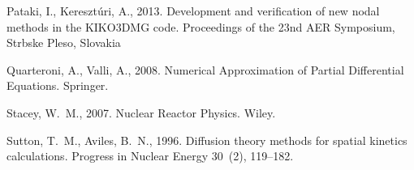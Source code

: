 \documentclass{aip-cp}
\begin{document}
\begin{thebibliography}{35}
Pataki, I., Keresztúri, A., 2013. Development and verification of new nodal methods in the KIKO3DMG code. Proceedings of the 23nd AER Symposium, Strbske Pleso, Slovakia

Quarteroni, A., Valli, A., 2008. Numerical Approximation of Partial
  Differential Equations. Springer.

Stacey, W.~M., 2007. Nuclear Reactor Physics. Wiley.

Sutton, T.~M., Aviles, B.~N., 1996. Diffusion theory methods for spatial
  kinetics calculations. Progress in Nuclear Energy 30~(2), 119--182.


\end{thebibliography}
\end{document}
